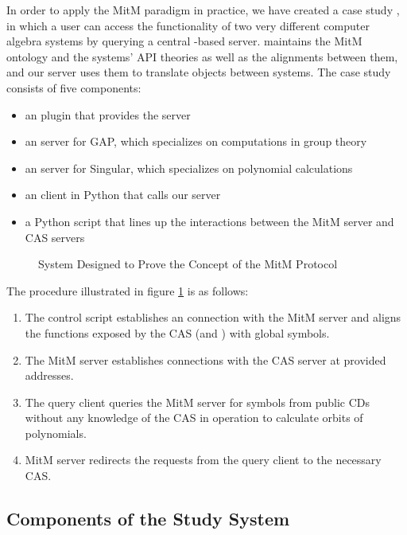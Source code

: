 In order to apply the MitM paradigm in practice, we have created a case study 
\cite{MitM-PoC}, in which a user can access the functionality of two very 
different computer algebra systems by querying a central \MMT-based server.
\MMT maintains the MitM ontology and the systems' API theories as well as the alignments between them, and our server uses them to translate objects between systems.
The case study consists of five components:

\begin{itemize}
  \item an \MMT plugin that provides the server
  \item an \SCSCP server for GAP, which specializes on computations in group theory
  \item an \SCSCP server for Singular, which specializes on polynomial calculations
  \item an \SCSCP client in Python that calls our server
  \item a Python script that lines up the interactions between the MitM server and CAS servers
\end{itemize}

\begin{figure}[ht]\centering
  \caption[\GAP-\Singular MitM Interaction]{
    System Designed to Prove the Concept of the MitM Protocol
  }\label{fig:mitmpoc}
\end{figure}

The procedure illustrated in figure \ref{fig:mitmpoc} is as follows:
\begin{enumerate}
  \item The control script establishes an \SCSCP connection with the \MMT MitM 
    server and aligns the functions exposed by the CAS (\GAP and \Singular) with
    global symbols.
  \item The MitM server establishes \SCSCP connections with the CAS server at
    provided addresses.
  \item The query client queries the MitM server for symbols from public CDs
    without any knowledge of the CAS in operation to calculate orbits of 
    polynomials.
  \item MitM server redirects the requests from the query client to the necessary
    CAS.
\end{enumerate}

\subsection{Components of the Study System}


